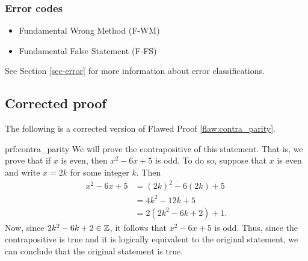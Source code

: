  
\subsubsection{Error codes}
\begin{itemize}
	\item 	Fundamental Wrong Method (F-WM)
	\item Fundamental False Statement (F-FS)
\end{itemize}
See Section \ref{sec-error} for more information about error classifications.

\clearpage
\subsection{Corrected proof}

The following is a corrected version of Flawed Proof \ref{flaw:contra_parity}. 

\begin{prf}{prf:contra_parity} 
We will prove the contrapositive of this statement. That is, we prove that if $x$ is even, then $x^2-6x+5$ is odd. To do so, suppose that $x$ is even and write $x = 2k$ for some integer $k.$ Then
\begin{align*}
    x^2-6x+5 &= (2k)^2 - 6(2k) + 5 \\
    &= 4k^2 - 12k + 5 \\
    &= 2(2k^2-6k+2)+1.
\end{align*}
Now, since $2k^2-6k+2 \in \mathbb Z$, it follows that $x^2-6x+5$ is odd. Thus, since the contrapositive is true and it is logically equivalent to  the original statement, we can conclude that the original statement is true.
\end{prf}